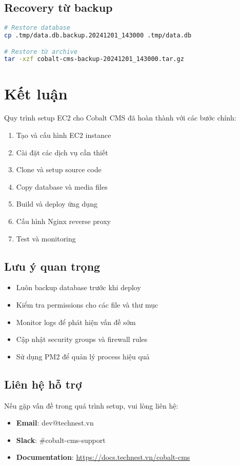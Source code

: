 \documentclass[12pt,a4paper]{article}
\begin{document}
\subsection{Recovery từ backup}
\begin{lstlisting}[language=bash]
# Restore database
cp .tmp/data.db.backup.20241201_143000 .tmp/data.db

# Restore từ archive
tar -xzf cobalt-cms-backup-20241201_143000.tar.gz
\end{lstlisting}

\section{Kết luận}

Quy trình setup EC2 cho Cobalt CMS đã hoàn thành với các bước chính:
\begin{enumerate}
    \item Tạo và cấu hình EC2 instance
    \item Cài đặt các dịch vụ cần thiết
    \item Clone và setup source code
    \item Copy database và media files
    \item Build và deploy ứng dụng
    \item Cấu hình Nginx reverse proxy
    \item Test và monitoring
\end{enumerate}

\subsection{Lưu ý quan trọng}
\begin{itemize}
    \item Luôn backup database trước khi deploy
    \item Kiểm tra permissions cho các file và thư mục
    \item Monitor logs để phát hiện vấn đề sớm
    \item Cập nhật security groups và firewall rules
    \item Sử dụng PM2 để quản lý process hiệu quả
\end{itemize}

\subsection{Liên hệ hỗ trợ}
Nếu gặp vấn đề trong quá trình setup, vui lòng liên hệ:
\begin{itemize}
    \item \textbf{Email}: dev@technest.vn
    \item \textbf{Slack}: \#cobalt-cms-support
    \item \textbf{Documentation}: \url{https://docs.technest.vn/cobalt-cms}
\end{itemize}
\end{document}
